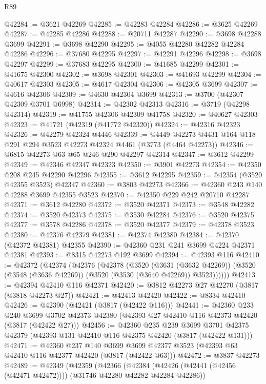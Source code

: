 \begin{lexlean}{R89}
\begin{coremodule}
@42284 := @3621 @42269
@42285 := @42283 @42284
@42286 := @3625 @42269
@42287 := @42285 @42286
@42288 := @20711 @42287
@42290 := @3698 @42288 @3699
@42291 := @3698 @42290
@42295 := @4055 @42280 @42282 @42284 @42286
@42296 := @37680 @42295
@42297 := @42291 @42296
@42298 := @3698 @42297
@42299 := @37683 @42295
@42300 := @41685 @42299
@42301 := @41675 @42300
@42302 := @3698 @42301
@42303 := @41693 @42299
@42304 := @40617 @42303
@42305 := @4617 @42304
@42306 := @42305 @3699
@42307 := @4616 @42306
@42309 := @4630 @42304 @3699
@42313 := @3700 (@42307 @42309 @3701 @6998)
@42314 := @42302 @42313
@42316 := @3719 (@42298 @42314)
@42319 := @41755 @42306 @42309 @41758
@42320 := @40627 @42303
@42323 := @41721 (@42319 (@41772 @42320))
@42324 := @42316 @42323
@42326 := @42279 @42324 @4446
@42339 := @4449 @42273 @4431 @164 @118 @291 @294 @3523 @42273 @42324 @4461 (@3773 (@4464 @42273))
@42346 := @6815 @42273 @63 @65 @246 @290 @42297 @42314
@42347 := @3612 @42299
@42349 := @42346 @42347 @42323
@42350 := @3901 @42273
@42354 := @42350 @208 @245 @42290 @42296
@42355 := @3612 @42295
@42359 := @42354 (@3520 @42355 @3523) @42347
@42360 := @3803 @42273
@42366 := @42360 @243 @140 @42288 @3699 @42355 @3523
@42370 := @42350 @229 @242 @20710 @42287
@42371 := @3612 @42280
@42372 := @3520 @42371
@42373 := @3548 @42282
@42374 := @3520 @42373
@42375 := @3530 @42284
@42376 := @3520 @42375
@42377 := @3578 @42286
@42378 := @3520 @42377
@42379 := @42378 @3523
@42380 := @42376 @42379
@42381 := @42374 @42380
@42384 := @42370 (@42372 @42381) @42355
@42390 := @42360 @231 @241 @3699 @4224 @42371 @42381
@42393 := @8315 @42273 @192 @3699
@42394 := @42393 @116
@42410 := @42372
    (@42374
      (@42376
        (@42378
          (@3520
            (@3631 (@3632 @42269))
            (@3520 (@3548 (@3636 @42269)) (@3520 (@3530 (@3640 @42269)) @3523))))))
@42413 := @42394 @42410 @116 @42371
@42420 := @3812 @42273 @27 @42270 (@3817 (@3818 @42273 @27))
@42421 := @42413 @42420
@42422 := @8334 @42410
@42426 := @42390 (@42421 (@3817 (@42422 @116)))
@42441 := @42360
    @233
    @240
    @3699
    @3702
    @42373
    @42380
    (@42393 @27 @42410 @116 @42373 @42420 (@3817 (@42422 @27)))
@42456 := @42360
    @235
    @239
    @3699
    @3701
    @42375
    @42379
    (@42393 @131 @42410 @116 @42375 @42420 (@3817 (@42422 @131)))
@42471 := @42360
    @237
    @140
    @3699
    @3699
    @42377
    @3523
    (@42393 @63 @42410 @116 @42377 @42420 (@3817 (@42422 @63)))
@42472 := @3837 @42273
@42489 := @42349
    (@42359
      (@42366
        (@42384 (@42426 (@42441 (@42456 (@42471 @42472)))) (@31746 @42280 @42282 @42284 @42286))

\end{coremodule}
\end{lexlean}
